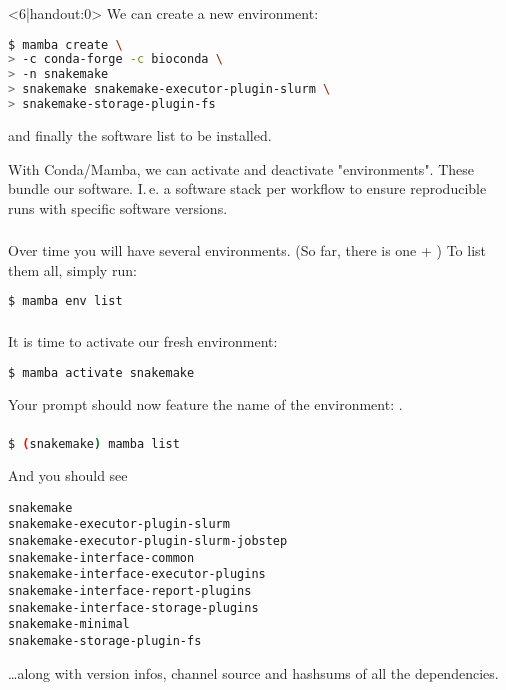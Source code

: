 \begin{frame}[fragile]
    \begin{onlyenv}<6|handout:0>
    	We can create a new environment:
    	\begin{lstlisting}[language=Bash, style=Shell]
$ mamba create \
> -c conda-forge -c bioconda \
> -n snakemake
> snakemake snakemake-executor-plugin-slurm \
> snakemake-storage-plugin-fs
    	\end{lstlisting}
    	and finally the software list to be installed.
    \end{onlyenv}
    \vfill
    \begin{docs}[What is an \emph{Environment}?]
    	With Conda/Mamba, we can activate and deactivate "environments". These bundle our software. I.\,e. a software stack per workflow to ensure reproducible runs with specific software versions.
    \end{docs}
\end{frame}

\begin{frame}[fragile]
	\frametitle{}
	Over time you will have several environments. (So far, there is one + ) To list them all, simply run:
	\begin{lstlisting}[language=Bash, style=Shell]
$ mamba env list
	\end{lstlisting}
\end{frame}

\begin{frame}[fragile]
	\frametitle{}
	It is time to activate our fresh environment:
	\begin{lstlisting}[language=Bash, style=Shell]
$ mamba activate snakemake
	\end{lstlisting}
    Your prompt should now feature the name of the environment: .
\end{frame}

\begin{frame}[fragile]
    \frametitle{}
    \begin{lstlisting}[language=Bash, style=Shell]
$ (snakemake) mamba list
    \end{lstlisting}
     And you should see
     \begin{lstlisting}[style=Plain]
snakemake
snakemake-executor-plugin-slurm
snakemake-executor-plugin-slurm-jobstep
snakemake-interface-common
snakemake-interface-executor-plugins
snakemake-interface-report-plugins
snakemake-interface-storage-plugins
snakemake-minimal
snakemake-storage-plugin-fs
     \end{lstlisting}
     \ldots along with version infos, channel source and hashsums of all the dependencies.
\end{frame}

